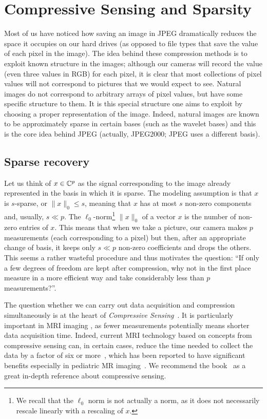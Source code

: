 \chapter{Compressive Sensing and Sparsity}
\label{c:cs}


Most of us have noticed how saving an image in JPEG dramatically reduces the space it occupies on our hard drives (as opposed to file types that save the value of each pixel in the image). The idea behind these compression methods is to exploit known structure in the images; although our cameras will record the  value (even three values in RGB) for each pixel, it is clear that most collections of pixel values will not correspond to pictures that we would expect to see. Natural images do not correspond to arbitrary arrays of pixel values, but have some specific structure to them. It is this  special structure one aims to exploit by choosing a proper representation of the image. Indeed, natural images are known to be approximately sparse in certain bases (such as the wavelet bases) and this is the core idea behind JPEG (actually, JPEG2000; JPEG uses a different basis).

\section{Sparse recovery}\label{s:sparse}

Let us think of $x\in \mathbb{C}^p$ as the signal corresponding to the image already represented in the basis in which it is sparse. The modeling assumption is that $x$ is $s$-sparse, or $\|x\|_0\leq s$, meaning that $x$ has at most $s$ non-zero components and, usually, $s\ll p$. The $\ell_0$-norm\footnote{We recall that the $\ell_0$ norm is not actually a norm, as it does not necessarily rescale linearly with a rescaling of $x$.} $\|x\|_0$ of a vector $x$ is the number of non-zero entries of $x$. 
This means that when we take a picture, our camera makes $p$ measurements (each corresponding to a pixel) but then, after an appropriate change of basis, it keeps only $s\ll p$ non-zero coefficients and drops the others. This seems a rather wasteful procedure and thus motivates the question: ``If only a few degrees of freedom are kept after compression, why not in the first place measure in a more efficient way and take considerably less than $p$ measurements?''. 

The question whether we can carry out  data acquisition and compression simultaneously is at the heart of {\em Compressive Sensing}~\cite{Candes_CS1,Candes_CS2,Candes_CS3,Candes_CS4,Donoho_CS,FoucartRauhut_CSbook}. It is particularly important in MRI imaging \cite{lustig2007sparse,feng2017compressed}, as fewer measurements potentially means shorter data acquisition time. Indeed, current MRI technology based on concepts from compressive sensing can, in certain cases, reduce the time needed to collect the data by a factor of six or more~\cite{lustig2007sparse}, which has been reported to have significant benefits especially in pediatric MR imaging~\cite{vasanawala2010improved}.
We recommend the book~\cite{FoucartRauhut_CSbook} as a great in-depth reference about compressive sensing.

